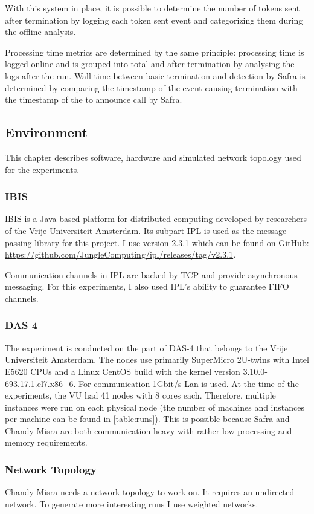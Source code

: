 With this system in place, it is possible to determine the number of tokens sent after termination by logging each token sent event and categorizing them during the offline analysis.

Processing time metrics are determined by the same principle: processing time is logged online and is grouped into total and after termination by analysing the logs after the run.
Wall time between basic termination and detection by Safra is determined by comparing the timestamp of the event causing termination with the timestamp of the to announce call by Safra.

\subsection{Environment}
This chapter describes software, hardware and simulated network topology used for the experiments.
\subsubsection{IBIS}
IBIS is a Java-based platform for distributed computing developed by researchers of the Vrije Universiteit Amsterdam. 
Its subpart IPL is used as the message passing library for this project. 
I use version 2.3.1 which can be found on GitHub: \href{https://github.com/JungleComputing/ipl/releases/tag/v2.3.1}{https://github.com/JungleComputing/ipl/releases/tag/v2.3.1}.

Communication channels in IPL are backed by TCP and provide asynchronous messaging.
For this experiments, I also used IPL's ability to guarantee FIFO channels.
\subsubsection{DAS 4}
The experiment is conducted on the part of DAS-4 that belongs to the Vrije Universiteit Amsterdam. 
The nodes use primarily SuperMicro 2U-twins with Intel E5620 CPUs and a Linux CentOS build with the kernel version 3.10.0-693.17.1.el7.x86\_6.
For communication 1Gbit/s Lan is used.
At the time of the experiments, the VU had 41 nodes with 8 cores each.
Therefore, multiple instances were run on each physical node (the number of machines and instances per machine can be found in \cref{table:runs}).
This is possible because Safra and Chandy Misra are both communication heavy with rather low processing and memory requirements.

\subsubsection{Network Topology}
Chandy Misra needs a network topology to work on. 
It requires an undirected network.
To generate more interesting runs I use weighted networks.

